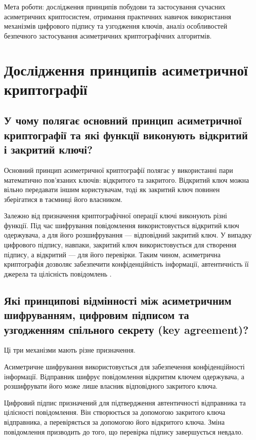 Мета роботи: дослідження принципів побудови та застосування сучасних асиметричних 
криптосистем, отримання практичних навичок використання механізмів цифрового 
підпису та узгодження ключів, аналіз особливостей безпечного застосування 
асиметричних криптографічних алгоритмів. 

\section{Дослідження принципів асиметричної криптографії}
\subsection{У чому полягає основний принцип асиметричної криптографії та які функції виконують відкритий і закритий ключі?}

Основний принцип асиметричної криптографії полягає у використанні пари математично 
пов'язаних ключів: відкритого та закритого. Відкритий ключ можна вільно передавати іншим користувачам, 
тоді як закритий ключ повинен зберігатися в таємниці його власником.

Залежно від призначення криптографічної операції ключі виконують різні функції. 
Під час шифрування повідомлення використовується відкритий ключ одержувача, 
а для його розшифрування — відповідний закритий ключ. У випадку цифрового підпису, навпаки, 
закритий ключ використовується для створення підпису, а відкритий — для його перевірки. 
Таким чином, асиметрична криптографія дозволяє забезпечити конфіденційність інформації, 
автентичність її джерела та цілісність повідомлень \cite{RFC8017}.


\subsection{Які принципові відмінності між асиметричним шифруванням, цифровим підписом та узгодженням спільного секрету (key agreement)?}

Ці три механізми мають різне призначення.

Асиметричне шифрування використовується для забезпечення конфіденційності інформації. 
Відправник шифрує повідомлення відкритим ключем одержувача, а розшифрувати його може 
лише власник відповідного закритого ключа.

Цифровий підпис призначений для підтвердження автентичності відправника та цілісності повідомлення. 
Він створюється за допомогою закритого ключа відправника, а перевіряється за допомогою його відкритого ключа. 
Зміна повідомлення призводить до того, що перевірка підпису завершується невдало.

